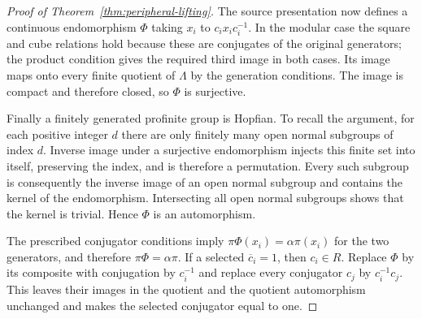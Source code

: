 \begin{proof}[Proof of Theorem~\ref{thm:peripheral-lifting}]
The source presentation now defines a continuous endomorphism
$\Phi$ taking $x_i$ to $c_ix_ic_i^{-1}$. In the modular case the
square and cube relations hold because these are conjugates of the
original generators; the product condition gives the required third
image in both cases. Its image maps onto every finite quotient of
$\Lambda$ by the generation conditions. The image is compact and
therefore closed, so $\Phi$ is surjective.

Finally a finitely generated profinite group is Hopfian. To recall the
argument, for each positive integer $d$ there are only finitely many
open normal subgroups of index $d$. Inverse image under a surjective
endomorphism injects this finite set into itself, preserving the index,
and is therefore a permutation. Every such subgroup is consequently
the inverse image of an open normal subgroup and contains the kernel
of the endomorphism. Intersecting all open normal subgroups shows that
the kernel is trivial. Hence $\Phi$ is an automorphism.

The prescribed conjugator conditions imply
$\pi\Phi(x_i)=\alpha\pi(x_i)$ for the two generators, and therefore
$\pi\Phi=\alpha\pi$. If a selected $\overline c_i=1$, then
$c_i\in R$. Replace $\Phi$ by its composite with conjugation by
$c_i^{-1}$ and replace every conjugator $c_j$ by $c_i^{-1}c_j$.
This leaves their images in the quotient and the quotient automorphism
unchanged and makes the selected conjugator equal to one.
\end{proof}
